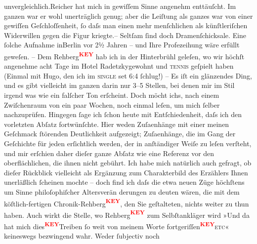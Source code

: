 {\begin{ledgroupsized}[t]{13cm}
                  unvergleichlich.Reicher hat mich in
               gewiſſem Sinne angenehm enttäuſcht. Im ganzen war er wohl unerträglich genug; aber
               die Leiſtung als ganzes war von einer gewiſſen Geſchloſſenheit, ſo daſs man einen
               mehr menſchlichen als künſtleriſchen Widerwillen gegen die Figur kriegte.– Seltſam
               ſind doch Dramenſchicksale. Eine ſolche Aufnahme inBerlin vor 2½ Jahren – und Ihre Profezeihung wäre erfüllt geweſen. – Dem Rehberg\textcolor{red}{\textsuperscript{\textbf{KEY}}} hab ich in der Hinterbrühl geleſen, wo wir höchſt angenehme acht Tage im Hotel Radetzkygewohnt und \textsc{tennis} geſpielt haben (Einmal mit Hugo, den ich im \textsc{single} set 6:4 ſchlug!) – Es iſt
               ein glänzendes Ding, und es gibt vielleicht im ganzen darin nur 3–5 Stellen, bei
               denen mir im Stil irgend was wie ein falſcher Ton erſcheint. Doch möcht ichs, nach
               einem Zwiſchenraum von ein paar Wochen, noch einmal leſen, um mich ſelber
               nachzuprüfen. Hingegen ſage ich ſchon heute mit Entſchiedenheit, daſs ich den
               vorletzten Abſatz fortwünſchte. Hier weden Zuſa{\geminationm}enhänge
               mit einer meinen Geſchmack ſtörenden Deutlichkeit aufgezeigt; Zuſa{\geminationm}enhänge, die im
               {\pb}Gang der Geſchichte  für jeden erſichtlich werden, der in
               anſtändiger Weiſe zu leſen verſteht, und mir erſchien daher dieſer ganze Abſatz wie
               eine Referenz vor den oberflächlichen, die ihnen nicht gebührt. Ich habe mich
               natürlich auch gefragt, ob dieſer Rückblick vielleicht als Ergänzung zum
               Charakterbild des Erzählers Ihnen unerläßlich ſcheinen mochte – doch find ich daſs
               die etwa neuen Züge höchſtens um Sinne philoſophiſcher Altersverän derungen zu deuten
               wären, die mit dem köſtlich-fertigen Chronik-Rehberg\textcolor{red}{\textsuperscript{\textbf{KEY}}}, den
               Sie geſtalteten, nichts weiter zu thun haben. Auch wirkt {\pb}die Stelle, wo Rehberg\textcolor{red}{\textsuperscript{\textbf{KEY}}} zum Selbſtankläger wird »Und da{\geminationn} hat mich dies\textcolor{red}{\textsuperscript{\textbf{KEY}}}Treiben ſo weit von meinem Worte fortgeriſſen\textcolor{red}{\textsuperscript{\textbf{KEY}}}\textsc{etc}« keineswegs bezwingend wahr. Weder ſubjectiv noch

\end{ledgroupsized}}
